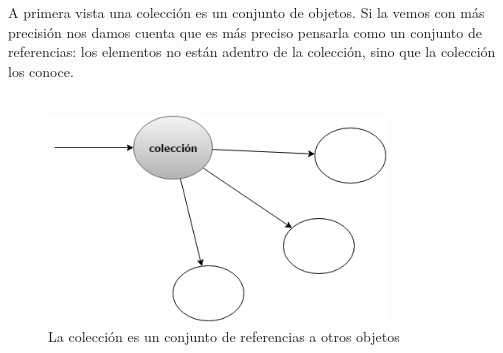 \documentclass[a4paper,12pt]{book}
\begin{document}
A primera vista una colección es un conjunto de objetos. Si la vemos con más precisión nos damos cuenta que es más
preciso pensarla como un conjunto de referencias: los elementos no están adentro de la colección, sino que la
colección los conoce. 
\\
\\
\begin{figure}
    \centering
    \includegraphics[width=0.8\textwidth]{images/01_GraficoInicial_Colecciones.png}
    \caption{La colección es un conjunto de referencias a otros objetos}
\end{figure}
\\
\end{document}

